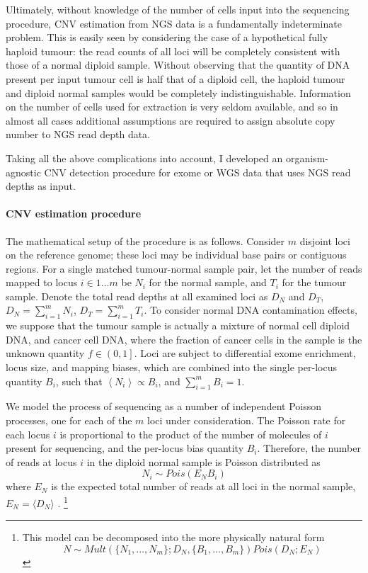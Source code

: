 \documentclass[thesis.tex]{subfiles}
\begin{document}
Ultimately, without knowledge of the number of cells input into the sequencing procedure, \gls{CNV} estimation from \gls{NGS} data is a fundamentally indeterminate problem.  This is easily seen by considering the case of a hypothetical fully haploid tumour: the read counts of all loci will be completely consistent with those of a normal diploid sample.  Without observing that the quantity of DNA present per input tumour cell is half that of a diploid cell, the haploid tumour and diploid normal samples would be completely indistinguishable.  Information on the number of cells used for extraction is very seldom available, and so in almost all cases additional assumptions are required to assign absolute copy number to \gls{NGS} read depth data.

Taking all the above complications into account, I developed an organism-agnostic \gls{CNV} detection procedure for exome or \gls{WGS} data that uses \gls{NGS} read depths as input.  

\paragraph{\Acrlong{CNV} estimation procedure}

The mathematical setup of the procedure is as follows.  Consider $m$ disjoint loci on the reference genome; these loci may be individual base pairs or contiguous regions.  For a single matched tumour-normal sample pair, let the number of reads mapped to locus $i \in 1 \dots m$ be $N_i$ for the normal sample, and $T_i$ for the tumour sample.  Denote the total read depths at all examined loci as $D_N$ and $D_T$, $D_N = \sum_{i=1}^{m} N_i$, $D_T = \sum_{i=1}^{m} T_i$. To consider normal DNA contamination effects, we suppose that the tumour sample is actually a mixture of normal cell diploid DNA, and cancer cell DNA, where the fraction of cancer cells in the sample is the unknown quantity $f \in \left(0, 1\right]$.  Loci are subject to differential exome enrichment, locus size, and mapping biases, which are combined into the single per-locus quantity $B_i$, such that $\left<N_i\right> \propto B_i$, and $\sum_{i=1}^{m} B_i = 1$.

We model the process of sequencing as a number of independent Poisson processes, one for each of the $m$ loci under consideration.  The Poisson rate for each locus $i$ is proportional to the product of the number of molecules of $i$ present for sequencing, and the per-locus bias quantity $B_i$.  Therefore, the number of reads at locus $i$ in the diploid normal sample is Poisson distributed as
\begin{equation}
  N_i \sim Pois\left(E_N B_i\right) \label{eq:comp_cnv_Npois}
\end{equation}
where $E_N$ is the expected total number of reads at all loci in the normal sample, $E_N = \langle D_N \rangle$ . \footnote{This model can be decomposed into the more physically natural form
\begin{equation}
  N \sim Mult\left(\{N_1, \dots, N_m\}; D_N, \{B_1, \dots, B_m\}\right) Pois\left(D_N; E_N\right)
\end{equation}}
\end{document}
